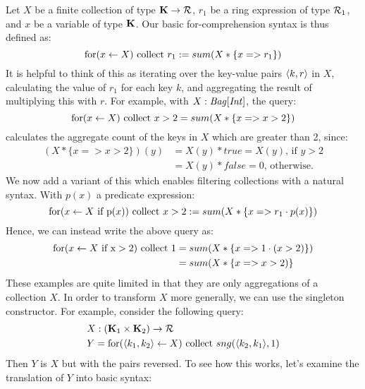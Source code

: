 {{{{Let $X$ be a finite collection of type $\mathbf{K} \rightarrow \mathcal{R}$, $r_1$ be a ring expression of type $\mathcal{R}_1$, and $x$ be a variable of type $\mathbf{K}$. Our basic for-comprehension syntax is thus defined as:
\begin{equation*}
\textrm{for}(x \leftarrow X) \textrm{ collect } r_1 := sum(X * \{x => r_1\})
\end{equation*}
It is helpful to think of this as iterating over the key-value pairs $\langle k, r \rangle$ in $X$, calculating the value of $r_1$ for each key $k$, and aggregating the result of multiplying this with $r$. For example, with $X: \textrm{\textit{Bag}}[\textrm{\textit{Int}}]$, the query:
\begin{equation*} 
\textrm{for}(x \leftarrow X) \textrm{ collect } x > 2 = sum(X * \{x => x > 2\})
\end{equation*}
calculates the aggregate count of the keys in $X$ which are greater than 2, since:
\begin{equation*}
\begin{split}
(X*\{x => x > 2\})(y) &= X(y)*true = X(y)\textrm{, if } y > 2 \\
 &= X(y)*false = 0\textrm{, otherwise.}
\end{split}
\end{equation*}
We now add a variant of this which enables filtering collections with a natural syntax. With $p(x)$ a predicate expression:
\begin{equation*}
\textrm{for}(x \leftarrow X \textrm{ if p}(x)) \textrm{ collect } x > 2 := sum(X * \{x => r_1 \cdot p(x) \})
\end{equation*}
Hence, we can instead write the above query as:
\begin{equation*}
\begin{split}
\textrm{for}(x \leftarrow X \textrm{ if x} > 2) \textrm{ collect } 1 &= sum(X * \{x => 1 \cdot (x > 2) \}) \\
&=sum(X * \{x => x > 2) \}
\end{split}
\end{equation*}
These examples are quite limited in that they are only aggregations of a collection $X$. In order to transform $X$ more generally, we can use the singleton constructor. For example, consider the following query:
\begin{equation*}
\begin{split}
&X: (\mathbf{K}_1 \times \mathbf{K}_2) \rightarrow \mathcal{R} \\
&Y = \textrm{for}(\langle k_1, k_2 \rangle \leftarrow X) \textrm{ collect } sng(\langle k_2, k_1 \rangle, 1)
\end{split}
\end{equation*}
Then $Y$ is $X$ but with the pairs reversed. To see how this works, let's examine the translation of $Y$ into basic syntax: 
}}}}
